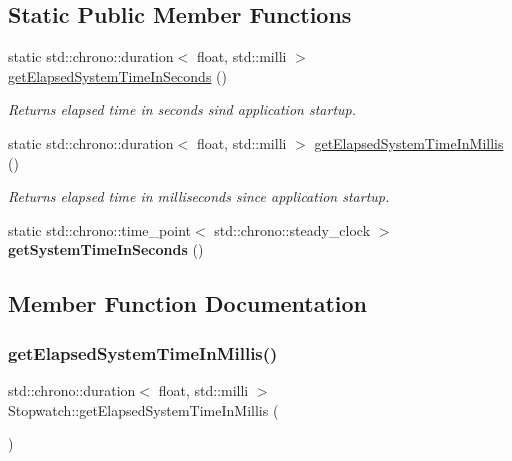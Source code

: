 \subsection*{Static Public Member Functions}
\begin{DoxyCompactItemize}
\item 
static std\+::chrono\+::duration$<$ float, std\+::milli $>$ \mbox{\hyperlink{class_stopwatch_a15494cf73d00c146c5151e348d9a5326}{get\+Elapsed\+System\+Time\+In\+Seconds}} ()
\begin{DoxyCompactList}\small\item\em Returns elapsed time in seconds sind application startup. \end{DoxyCompactList}\item 
static std\+::chrono\+::duration$<$ float, std\+::milli $>$ \mbox{\hyperlink{class_stopwatch_af7edf796a45302f8dcee3ab784aa60ad}{get\+Elapsed\+System\+Time\+In\+Millis}} ()
\begin{DoxyCompactList}\small\item\em Returns elapsed time in milliseconds since application startup. \end{DoxyCompactList}\item 
\mbox{\label{class_stopwatch_aed8349df72b0a516d6d43022414d8620}} 
static std\+::chrono\+::time\+\_\+point$<$ std\+::chrono\+::steady\+\_\+clock $>$ {\bfseries get\+System\+Time\+In\+Seconds} ()
\end{DoxyCompactItemize}


\subsection{Member Function Documentation}
\mbox{\label{class_stopwatch_af7edf796a45302f8dcee3ab784aa60ad}} 
\subsubsection{\texorpdfstring{getElapsedSystemTimeInMillis()}{getElapsedSystemTimeInMillis()}}
{\footnotesize\ttfamily std\+::chrono\+::duration$<$ float, std\+::milli $>$ Stopwatch\+::get\+Elapsed\+System\+Time\+In\+Millis (\begin{DoxyParamCaption}{ }\end{DoxyParamCaption})\hspace{0.3cm}{\ttfamily [static]}}




